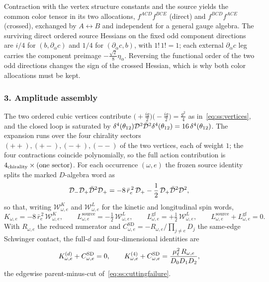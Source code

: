 Contraction with the vertex structure constants and the source yields the
common color tensor in its two allocations, $f^{ACD}f^{BCE}$ (direct) and
$f^{BCD}f^{ACE}$ (crossed), exchanged by $A\leftrightarrow B$ and independent
for a general gauge algebra. The surviving direct ordered source Hessians on
the fixed odd component directions are $i/4$ for $(b,\partial_{\dot\alpha}c)$
and $1/4$ for $(\partial_{\dot\alpha}c,b)$, with $1!\,1!=1$; each external
$\partial_{\dot\alpha}c$ leg carries the component preimage
$-\frac{\sqrt2}{8}\eta_{\dot\alpha}$. Reversing the functional order of the
two odd directions changes the sign of the crossed Hessian, which is why both
color allocations must be kept.

\subsubsection*{3. Amplitude assembly}

The two ordered cubic vertices contribute
$\big(+\frac{ig}{2}\big)\big(-\frac{ig}{2}\big)=\frac{g^{2}}{4}$
as in~\eqref{eq:ss:vertices}, and the closed loop is saturated by
$\delta^{4}(\theta_{12})\mathcal{D}^{2}\bar{\mathcal{D}}^{2}\delta^{4}(\theta_{12})
=16\,\delta^{4}(\theta_{12})$. The expansion runs over the four chirality
sectors $(++),(+-),(-+),(--)$ of the two vertices, each of weight $1$; the
four contractions coincide polynomially, so the full action contribution is
$4_{\rm chirality}\times(\text{one sector})$. For each occurrence $(\omega,e)$
the frozen source identity splits the marked $D$-algebra word as
\begin{equation}\label{eq:ss:ad-split}
\mathcal{D}_{-}\mathcal{D}_{+}\bar{\mathcal{D}}^{2}\mathcal{D}_{+}
=-8\,\bar r_{e}^{\,2}\,\mathcal{D}_{+}-\frac12\,\mathcal{D}_{+}\bar{\mathcal{D}}^{2}\mathcal{D}^{2},
\end{equation}
so that, writing $\mathscr W^{K}_{\omega,e}$ and $\mathscr W^{L}_{\omega,e}$
for the kinetic and longitudinal spin words,
\begin{equation}\label{eq:ss:ad-kl}
K_{\omega,e}=-8\,\bar r_{e}^{\,2}\,\mathscr W^{K}_{\omega,e},
\qquad
L^{\mathrm{source}}_{\omega,e}=-\tfrac12\,\mathscr W^{L}_{\omega,e},
\qquad
L^{\mathrm{gf}}_{\omega,e}=+\tfrac12\,\mathscr W^{L}_{\omega,e},
\qquad
L^{\mathrm{source}}_{\omega,e}+L^{\mathrm{gf}}_{\omega,e}=0 .
\end{equation}
With $R_{\omega,e}$ the reduced numerator and
$C^{\mathrm{SD}}_{\omega,e}=-R_{\omega,e}/\prod_{j\ne e}D_{j}$ the same-edge
Schwinger contact, the full-$d$ and four-dimensional identities are
\begin{equation}\label{eq:ss:ad-sd}
K^{(d)}_{\omega,e}+C^{\mathrm{SD}}_{\omega,e}=0,
\qquad
K^{(4)}_{\omega,e}+C^{\mathrm{SD}}_{\omega,e}
=\frac{\mu_\ell^{2}\,R_{\omega,e}}{D_{0}D_{1}D_{2}},
\end{equation}
the edgewise parent-minus-cut of~\eqref{eq:ss:cuttingfailure}.

